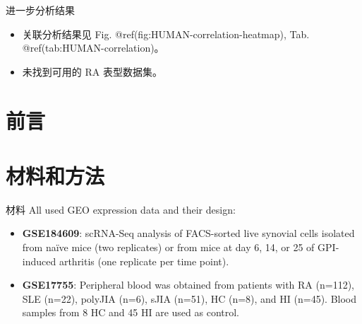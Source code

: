 \documentclass[
  ignorenonframetext,
]{beamer}
\providecommand{\tightlist}{%
  \setlength{\itemsep}{0pt}\setlength{\parskip}{0pt}}
\begin{document}
\begin{frame}{进一步分析结果}
\protect\hypertarget{ux8fdbux4e00ux6b65ux5206ux6790ux7ed3ux679c}{}
\begin{itemize}
\tightlist
\item
  关联分析结果见 Fig. @ref(fig:HUMAN-correlation-heatmap), Tab.
  @ref(tab:HUMAN-correlation)。
\item
  未找到可用的 RA 表型数据集。
\end{itemize}
\end{frame}

\hypertarget{introduction}{%
\section{前言}\label{introduction}}

\hypertarget{methods}{%
\section{材料和方法}\label{methods}}

\begin{frame}{材料}
\protect\hypertarget{ux6750ux6599}{}
All used GEO expression data and their design:

\begin{itemize}
\item
  \textbf{GSE184609}: scRNA-Seq analysis of FACS-sorted live synovial
  cells isolated from naïve mice (two replicates) or from mice at day 6,
  14, or 25 of GPI-induced arthritis (one replicate per time point).
\item
  \textbf{GSE17755}: Peripheral blood was obtained from patients with RA
  (n=112), SLE (n=22), polyJIA (n=6), sJIA (n=51), HC (n=8), and HI
  (n=45). Blood samples from 8 HC and 45 HI are used as control.
\end{itemize}
\end{frame}
\end{document}
